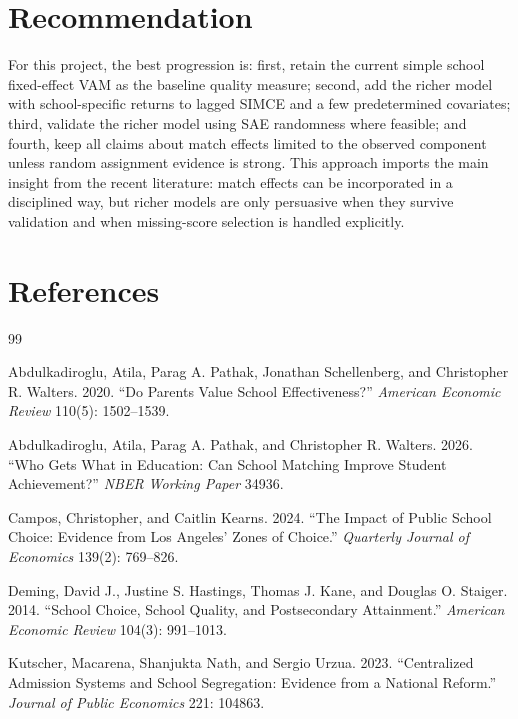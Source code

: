 \documentclass[11pt]{article}
\begin{document}
\section*{Recommendation}

For this project, the best progression is: first, retain the current simple school fixed-effect VAM as the baseline quality measure; second, add the richer model with school-specific returns to lagged SIMCE and a few predetermined covariates; third, validate the richer model using SAE randomness where feasible; and fourth, keep all claims about match effects limited to the observed component unless random assignment evidence is strong. This approach imports the main insight from the recent literature: match effects can be incorporated in a disciplined way, but richer models are only persuasive when they survive validation and when missing-score selection is handled explicitly.

\section*{References}

\begin{thebibliography}{99}

Abdulkadiroglu, Atila, Parag A. Pathak, Jonathan Schellenberg, and Christopher R. Walters. 2020.
``Do Parents Value School Effectiveness?''
\emph{American Economic Review} 110(5): 1502--1539.

Abdulkadiroglu, Atila, Parag A. Pathak, and Christopher R. Walters. 2026.
``Who Gets What in Education: Can School Matching Improve Student Achievement?''
\emph{NBER Working Paper} 34936.

Campos, Christopher, and Caitlin Kearns. 2024.
``The Impact of Public School Choice: Evidence from Los Angeles' Zones of Choice.''
\emph{Quarterly Journal of Economics} 139(2): 769--826.

Deming, David J., Justine S. Hastings, Thomas J. Kane, and Douglas O. Staiger. 2014.
``School Choice, School Quality, and Postsecondary Attainment.''
\emph{American Economic Review} 104(3): 991--1013.

Kutscher, Macarena, Shanjukta Nath, and Sergio Urzua. 2023.
``Centralized Admission Systems and School Segregation: Evidence from a National Reform.''
\emph{Journal of Public Economics} 221: 104863.

\end{thebibliography}
\end{document}
